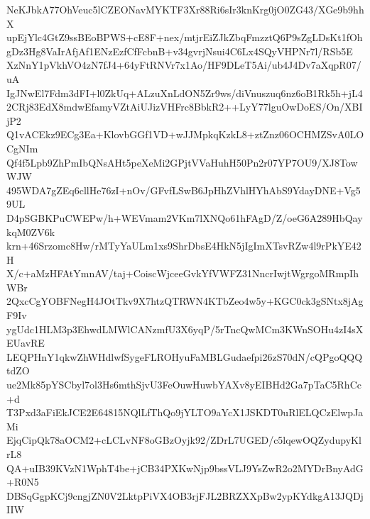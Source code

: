 NeKJbkA77OhVeuc5lCZEONavMYKTF3Xr88Ri6sIr3knKrg0jO0ZG43/XGe9b9hhX
upEjYlc4GtZ9ssBEoBPWS+cE8F+nex/mtjrEiZJkZbqFmzztQ6P9sZgLDsKt1fOh
gDz3Hg8VaIrAfjAf1ENzEzfCfFcbnB+v34gvrjNsui4C6Lx4SQyVHPNr7l/RSb5E
XzNnY1pVkhVO4zN7fJ4+64yFtRNVr7x1Ao/HF9DLeT5Ai/ub4J4Dv7aXqpR07/uA
IgJNwEl7Fdm3dFI+l0ZkUq+ALzuXnLdON5Zr9ws/diVnuszuq6nz6oB1Rk5h+jL4
2CRj83EdX8mdwEfamyVZtAiUJizVHFrc8BbkR2++LyY77lguOwDoES/On/XBIjP2
Q1vACEkz9ECg3Ea+KlovbGGf1VD+wJJMpkqKzkL8+ztZnz06OCHMZSvA0LOCgNIm
Qf4f5Lpb9ZhPmIbQNsAHt5peXeMi2GPjtVVaHuhH50Pn2r07YP7OU9/XJ8TowWJW
495WDA7gZEq6cllHe76zI+nOv/GFvfLSwB6JpHhZVhlHYhAbS9YdayDNE+Vg59UL
D4pSGBKPuCWEPw/h+WEVmam2VKm7lXNQo61hFAgD/Z/oeG6A289HbQaykqM0ZV6k
krn+46Srzomc8Hw/rMTyYaULm1xs9ShrDbsE4HkN5jIgImXTsvRZw4l9rPkYE42H
X/c+aMzHFAtYmnAV/taj+CoiscWjceeGvkYfVWFZ31NncrIwjtWgrgoMRmpIhWBr
2QxcCgYOBFNegH4JOtTkv9X7htzQTRWN4KTbZeo4w5y+KGC0ck3gSNtx8jAgF9Iv
ygUdc1HLM3p3EhwdLMWlCANzmfU3X6yqP/5rTncQwMCm3KWnSOHu4zI4sXEUavRE
LEQPHnY1qkwZhWHdlwfSygeFLROHyuFaMBLGudaefpi26zS70dN/cQPgoQQQtdZO
ue2Mk85pYSCbyl7ol3Hs6mthSjvU3FeOuwHuwbYAXv8yEIBHd2Ga7pTaC5RhCc+d
T3Pxd3aFiEkJCE2E64815NQlLfThQo9jYLTO9aYcX1JSKDT0uRlELQCzElwpJaMi
EjqCipQk78aOCM2+cLCLvNF8oGBzOyjk92/ZDrL7UGED/c5lqewOQZydupyKlrL8
QA+uIB39KVzN1WphT4be+jCB34PXKwNjp9bssVLJ9YsZwR2o2MYDrBnyAdG+R0N5
DBSqGgpKCj9cngjZN0V2LktpPiVX4OB3rjFJL2BRZXXpBw2ypKYdkgA13JQDjIIW
